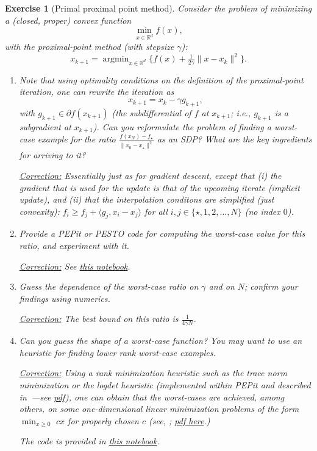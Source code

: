 \documentclass[11pt,a4paper]{article}
\newcommand{\inner}[2]{{\langle #1, #2\rangle}}
\DeclareMathOperator*{\argmin}{argmin}
\newcommand{\pesto}{{PESTO }}
\newcommand{\pepit}{{PEPit }}
\newcommand{\correction}[1]{{{\color{blue}\underline{Correction:} #1}}}
\newcommand{\correction}[1]{}
\newtheorem{exercise}{Exercise}
\begin{document}
	\begin{exercise}[Primal proximal point method]\label{ex:ppm}
	Consider the problem of minimizing a (closed, proper) convex function
	\[ \min_{x\in\mathbb{R}^d} f(x),\]
	with the proximal-point method (with stepsize $\gamma$):
	\[ x_{k+1}=\argmin_{x\in\mathbb{R}^d} \{ f(x)+\tfrac{1}{2\gamma}\|x-x_k\|^2\}.\]
	\begin{enumerate}
	\item Note that using optimality conditions on the definition of the proximal-point iteration, one can rewrite the iteration as
	\[ x_{k+1} = x_k - \gamma g_{k+1}, \]
	with $g_{k+1}\in\partial f(x_{k+1})$ (the subdifferential of $f$ at $x_{k+1}$; i.e., $g_{k+1}$ is a subgradient at $x_{k+1}$). Can you reformulate the problem of finding a worst-case example for the ratio $\frac{f(x_N)-f_\star}{\|x_0-x_\star\|^2}$ as an SDP? What are the key ingredients for arriving to it?
	
	\correction{Essentially just as for gradient descent, except that (i) the gradient that is used for the update is that of the upcoming iterate (implicit update), and (ii) that the interpolation conditons are simplified (just convexity): $f_i\geqslant f_j+\inner{g_j}{x_i-x_j}$ for all $i,j\in\{\star,1,2,\ldots,N\}$ (no index $0$).}
	
	\item Provide a \pepit or \pesto code for computing the worst-case value for this ratio, and experiment with it.
	
	\correction{See \href{https://github.com/PerformanceEstimation/Learning-Performance-Estimation/tree/main/Codes/Jupyter/Exercise04.ipynb}{this notebook}.}
	
	\item Guess the dependence of the worst-case ratio on $\gamma$ and on $N$; confirm your findings using numerics.
	
	\correction{The best bound on this ratio is $\frac{1}{4\gamma N}$.}
	
	\item Can you guess the shape of a worst-case function? You may want to use an heuristic for finding lower rank worst-case examples.
	
	\correction{Using a rank minimization heuristic such as the trace norm minimization or the logdet heuristic (implemented within \pepit and described in~\cite{fazel2003log}---see \href{https://web.stanford.edu/~boyd/papers/pdf/rank_min_heur_hankel.pdf}{pdf}), one can obtain that the worst-cases are achieved, among others, on some one-dimensional linear minimization problems of the form $\min_{x\geqslant 0} \,\, cx$ for properly chosen $c$ (see, \cite[Theorem 4.1]{taylor2015exact}; \href{https://arxiv.org/pdf/1512.07516.pdf}{pdf here}.)
	
	The code is provided in \href{https://github.com/PerformanceEstimation/Learning-Performance-Estimation/tree/main/Codes/Jupyter/Exercise04.ipynb}{this notebook}.}
	\end{enumerate}
	\end{exercise}
	
\end{document}
